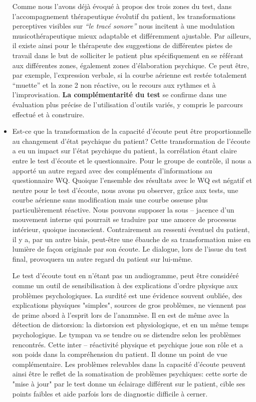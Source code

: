 \begin{itemize}
  
 Comme nous l'avons déjà évoqué à propos des trois zones du test, 
 dans l'accompagnement thérapeutique évolutif du patient,
 les transformations perceptives visibles sur
 \textit{``le tracé sonore''} nous incitent à une modulation
 musicothérapeutique mieux adaptable et différemment ajustable.
 Par ailleurs,  il existe ainsi pour le thérapeute des
 suggestions de différentes pistes de travail dans le but de
 solliciter le patient plus spécifiquement en se référant aux
 différentes zones, également zones
 d'élaboration psychique. Ce peut être, par exemple,
 l'expression verbale, si la courbe aérienne est restée
 totalement ``muette'' et la zone 2 non
 réactive, ou le recours aux rythmes et à l'improvisation.
  \textbf{La complémentarité du test} se confirme dans une évaluation plus
 précise de l'utilisation d'outils variés, y compris  le parcours effectué et à
 construire.%
 	\item Est-ce que la transformation de la capacité d'écoute peut être proportionnelle au 
 changement d'état psychique du patient?
   Cette transformation de l'écoute a eu  un impact sur l'état
 psychique du patient, la corrélation étant claire entre le test d'écoute et le questionnaire.
 Pour le groupe de contrôle, il nous a
 apporté un autre regard avec des compléments d'informations au 
 questionnaire
 WQ. Quoique l'ensemble des résultats avec le WQ est
 négatif et neutre pour le
 test d'écoute, nous avons pu observer, grâce aux tests, une 
 courbe 
 aérienne
 sans modification mais une courbe osseuse plus
 particulièrement réactive. 
 Nous pouvons supposer   %
 la sous -- jacence 
 d'un mouvement interne qui pourrait se traduire par 
 une amorce de
 processus intérieur,  quoique inconscient. Contrairement au ressenti éventuel du patient, il y  a, par un 
 autre biais, peut-être une 
 ébauche de sa transformation mise en lumière de façon originale  par son
 écoute. Le dialogue, lors de l'issue du test final,  provoquera un autre 
 regard du patient sur lui-même.
 
 
 Le test d'écoute tout en n'étant pas un audiogramme,  peut  être considéré comme un 
 outil de sensibilisation à des explications 
 d'ordre physique aux problèmes psychologiques. La surdité est une évidence souvent oubliée, des 
 explications physiques "simples", sources de gros problèmes, ne viennent pas de prime abord à l'esprit 
 lors de l'anamnèse. Il en est de même avec la détection de distorsion:
 la distorsion est physiologique, et en un même temps psychologique. Le tympan va se tendre ou se 
 distendre 
 selon les problèmes rencontrés. Cette inter -- réactivité physique et psychique joue son rôle et a son 
 poids dans la compréhension du patient. Il donne un point de vue complémentaire.
  Les problèmes relevables dans la capacité d'écoute peuvent ainsi être  le reflet de la somatisation de 
 problèmes psychiques: 
 cette sorte de  "mise  à jour" par le test donne un éclairage différent sur le patient, cible ses points 
 faibles et aide 
 parfois lors de diagnostic difficile à cerner.
 

\end{itemize}
